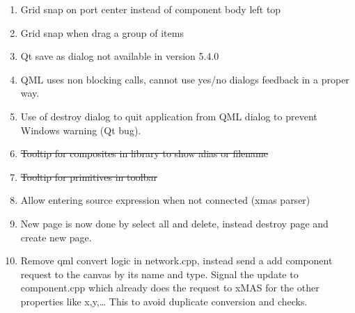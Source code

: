 \begin{enumerate}\label{sec:fix-list}
\item	Grid snap on port center instead of component body left top
\item	Grid snap when drag a group of items
\item	Qt save as dialog not available in version 5.4.0
\item QML uses non blocking calls, cannot use yes/no dialogs feedback in a
proper way.
\item Use of destroy dialog to quit application from QML dialog to prevent
Windows warning (Qt bug).
\item	\st{Tooltip for composites in library to show alias or filename}
\item	\st{Tooltip for primitives in toolbar}
\item Allow entering source expression when not connected (xmas parser)
\item New page is now done by select all and delete, instead destroy page and
create new page.
\item Remove qml convert logic in network.cpp, instead send a add component
request to the canvas by its name and type. Signal the update to component.cpp
which already does the request to xMAS for the other properties like x,y,… This
to avoid duplicate conversion and checks.
\end{enumerate}
